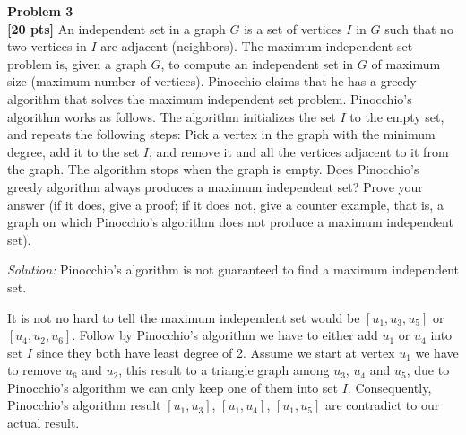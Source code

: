 \documentclass{article}
\newenvironment{problem}[2][Problem]
    { \begin{mdframed}[backgroundcolor=gray!20] \textbf{#1 #2} \\}
    {  \end{mdframed}}
\newenvironment{solution}
    {\textit{Solution:}}
    {}
\begin{document}
\newpage
\begin{problem}{3}
\textbf{[20 pts]}
An independent set in a graph $G$ is a set of vertices $I$ in $G$ such that no two vertices in $I$ are adjacent (neighbors). The maximum independent set problem is, given a graph $G$, to compute an independent set in $G$ of maximum size (maximum number of vertices). Pinocchio claims that he has a greedy algorithm that solves the maximum independent set problem. Pinocchio’s algorithm works as follows. The algorithm initializes the set $I$ to the empty set, and repeats the following steps: Pick a vertex in the graph with the minimum degree, add it to the set $I$, and remove it and all the vertices adjacent to it from the graph. The algorithm stops when the graph is empty. Does Pinocchio’s greedy algorithm always produces a maximum independent set? Prove your answer (if it does, give a proof; if it does not, give a counter example, that is, a graph on which Pinocchio’s algorithm does not produce a maximum independent set).
\end{problem}
\begin{solution}
\newline
Pinocchio’s algorithm is not guaranteed to find a maximum independent set.
\newline
{}
\newline
It is not no hard to tell the maximum independent set would be $[u_1, u_3, u_5]$ or $[u_4, u_2, u_6]$. Follow by Pinocchio’s algorithm we have to either add $u_1$ or $u_4$ into set $I$ since they both have least degree of 2. Assume we start at vertex $u_1$ we have to remove $u_6$ and $u_2$, this result to a triangle graph among $u_3$, $u_4$ and $u_5$, due to Pinocchio’s algorithm we can only keep one of them into set $I$.
Consequently, Pinocchio’s algorithm result $[u_1, u_3]$, $[u_1, u_4]$, $[u_1, u_5]$ are contradict to our actual result.
\end{solution}
\end{document}
